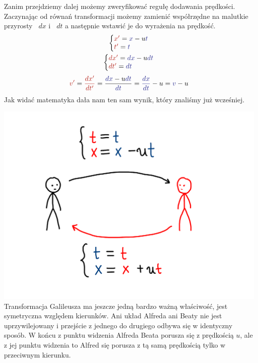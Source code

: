 \documentclass[10pt,twocolumn,fleqn,polish]{article}
\makeatletter
\providecommand{\mathcolor}[2]{{\color{#1}#2}}
\newcommand{\diff}{\mathop{}\!{d}}
\newcommand{\derivative}[2][]{\mathop{}\!\frac{{d}#1}{{d}#2}}
\newenvironment{eqsystem}
  {\left\lbrace
    \begin{array}{@{}l@{}}}
  {\end{array}\right.}
\makeatother
\begin{document}
Zanim przejdziemy dalej możemy zweryfikować regułę dodawania prędkości.
Zaczynając od równań transformacji możemy zamienić współrzędne na
malutkie przyrosty $\diff x$ i $\diff t$ a następnie wstawić je do wyrażenia na prędkość.
\begin{gather*}
  \begin{eqsystem}
    \mathcolor{BrickRed}{x'} = \mathcolor{Blue}{x}- u\mathcolor{Blue}{t} \\
    \mathcolor{BrickRed}{t'} = \mathcolor{Blue}{t}
  \end{eqsystem} \\
  \begin{eqsystem}
    \mathcolor{BrickRed}{\diff x'} = \mathcolor{Blue}{\diff x}- u\mathcolor{Blue}{\diff t} \\
    \mathcolor{BrickRed}{\diff t'} = \mathcolor{Blue}{\diff t}
  \end{eqsystem}
\end{gather*}
\[
  \mathcolor{BrickRed}{v'}
  = \mathcolor{BrickRed}{\derivative[x']{t'}}
  = \frac{\mathcolor{Blue}{\diff x} - u \mathcolor{Blue}{\diff t}}{\mathcolor{Blue}{\diff t}}
  = {\color{Blue}\derivative[x]{t}} - u
    = {\color{Blue}{v}} - u
\]
Jak widać matematyka dała nam ten sam wynik, który znaliśmy już wcześniej.
\newpage

\noindent\includegraphics[width=1\linewidth]{pages/STA-page8}
Transformacja Galileusza ma jeszcze jedną bardzo ważną właściwość,
jest symetryczna względem kierunków. Ani układ Alfreda ani Beaty nie jest uprzywilejowany
i przejście z jednego do drugiego odbywa się w identyczny sposób.
W końcu z punktu widzenia Alfreda Beata porusza się z prędkością $u$,
ale z jej punktu widzenia to Alfred się porusza z tą samą prędkością
tylko w przeciwnym kierunku.
\newpage
\end{document}

